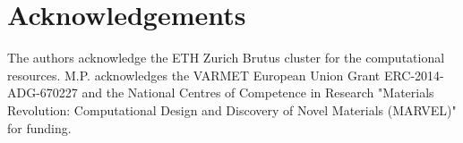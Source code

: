 \documentclass[journal=cgdefu,manuscript=article,layout=twocolumn]{achemso}
\begin{document}
\section{Acknowledgements}
The authors acknowledge the ETH Zurich Brutus cluster for the computational resources. M.P. acknowledges the VARMET European Union Grant ERC-2014-ADG-670227 and the National Centres of Competence in Research "Materials Revolution: Computational Design and Discovery of Novel Materials (MARVEL)" for funding.





%
%
\end{document}
